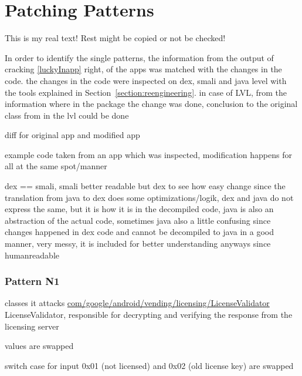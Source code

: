 \section{Patching Patterns} \label{section:luckypatcher-patterns}
This is my real text! Rest might be copied or not be checked!

In order to identify the single patterns, the information from the output of cracking \ref{luckyInapp} right, of the apps was matched with the changes in the code. the changes in the code were inspected on dex, smali and java level with the tools explained in Section~\ref{section:reengineering}. in case of LVL, from the information where in the package the change was done, conclusion to the original class from in the lvl could be done

diff for original app and modified app

example code taken from an app which was inspected, modification happens for all at the same spot/manner

dex == smali, smali better readable but dex to see how easy change
since the translation from java to dex does some optimizations/logik, dex and java do not express the same, but it is how it is in the decompiled code, java is also an abstraction of the actual code, sometimes java also a little confusing since changes happened in dex code and cannot be decompiled to java in a good manner, very messy, it is included for better understanding anyways since humanreadable
\subsubsection{Pattern N1}
classes it attacks
\url{com/google/android/vending/licensing/LicenseValidator}
LicenseValidator, responsible for decrypting and verifying the response from the licensing server\cite{developersLicensingReference}



values are swapped



switch case for input 0x01 (not licensed) and 0x02 (old license key) are swapped


